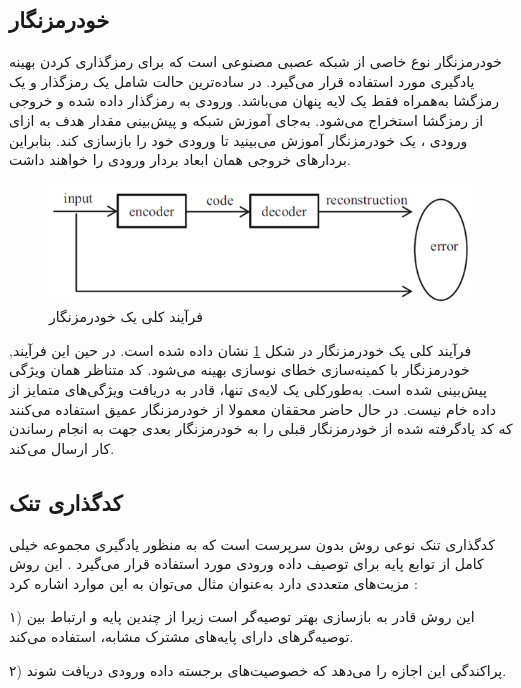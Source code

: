 \subsection{خودرمزنگار}
خودرمزنگار
نوع خاصی از شبکه عصبی مصنوعی است که برای رمزگذاری کردن
بهینه یادگیری مورد استفاده قرار می‌گیرد. در ساده‌ترین حالت شامل یک رمزگذار
و یک رمزگشا
به‌همراه فقط یک لایه پنهان می‌باشد. ورودی به رمزگذار داده شده و خروجی از رمزگشا استخراج می‌شود. به‌جای آموزش شبکه و پیش‌بینی مقدار هدف
به ازای ورودی
،
یک خودرمزنگار آموزش می‌بینید تا ورودی
خود را بازسازی کند. بنابراین بردارهای خروجی همان ابعاد بردار ورودی را خواهند داشت.
\begin{figure}[!h]
\centering
\includegraphics[scale=.8]{section2/autoC.png}
	\caption{فرآیند کلی یک خودرمزنگار\cite{Guo Y2016}}
\label{autoC}
\end{figure}
فرآیند کلی یک خودرمزنگار در شکل
\ref{autoC}
نشان داده شده است. در حین این فرآیند, خودرمزنگار با کمینه‌سازی خطای نوسازی
بهینه می‌شود. کد متناظر همان ویژگی پیش‌بینی شده است. به‌طورکلی یک لایه‌ی تنها، قادر به دریافت ویژگی‌های متمایز از داده خام نیست. در حال حاضر محققان معمولا از خودرمزنگار عمیق استفاده می‌کنند که کد یادگرفته شده از خودرمزنگار قبلی را به خودرمزنگار بعدی جهت به انجام رساندن کار ارسال می‌کند.


\subsection{کدگذاری تنک}
کدگذاری تنک
نوعی روش بدون سرپرست است که به منظور یادگیری مجموعه خیلی کامل
 از توابع پایه برای توصیف داده ورودی مورد استفاده قرار می‌گیرد
\cite{B.A. Olshausen۱997}.
این روش مزیت‌های متعددی دارد به‌عنوان مثال می‌توان به این موارد اشاره کرد :
 
۱) این روش قادر به بازسازی بهتر توصیه‌گر است زیرا از چندین پایه و ارتباط بین توصیه‌گرهای دارای پایه‌های مشترک‌ مشابه، استفاده می‌کند.
  
۲) پراکندگی این اجازه را می‌دهد که خصوصیت‌های برجسته داده ورودی دریافت شوند.


